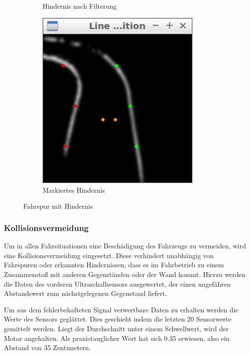 \begin{figure}
\begin{subfigure}{0.45\textwidth}
		\caption{Hindernis nach Filterung}
	\end{subfigure}
	\begin{subfigure}{0.45\textwidth}
		\centering
		\includegraphics[width=0.9\textwidth]{images/obstacle_bw.png}
		\caption{Markiertes Hindernis}
	\end{subfigure}
	\caption{Fahrspur mit Hindernis}
	\label{Bild von Hindernis}
\end{figure}


\subsubsection{Kollisionsvermeidung}
\label{sec:kollision}
Um in allen Fahrsituationen eine Beschädigung des Fahrzeugs zu vermeiden, wird eine Kollisionsvermeidung eingesetzt. Diese verhindert unabhängig von Fahrspuren oder erkannten Hindernissen, dass es im Fahrbetrieb zu einem Zusammenstoß mit anderen Gegenständen oder der Wand kommt. Hierzu werden die Daten des vorderen Ultraschallsensors ausgewertet, der einen ungefähren Abstandswert zum nächstgelegenen Gegenstand liefert.

Um aus dem fehlerbehafteten Signal verwertbare Daten zu erhalten werden die Werte des Sensors geglättet. Dies geschieht indem die letzten 20 Sensorwerte gemittelt werden. Liegt der Durchschnitt unter einem Schwellwert, wird der Motor angehalten. Als praxistauglicher Wert hat sich 0.35 erwiesen, also ein Abstand von 35 Zentimetern.

